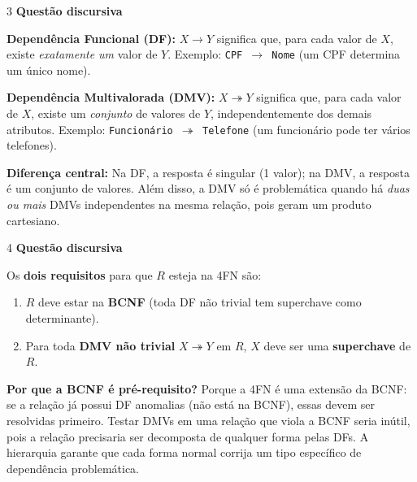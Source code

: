 \documentclass[12pt]{article}
\begin{document}
\vspace{0.5cm}

\begin{gabbox}{3}
\textbf{Questão discursiva}
\end{gabbox}

\begin{respdisc}
\textbf{Dependência Funcional (DF):} $X \to Y$ significa que, para cada valor de $X$, existe \emph{exatamente um} valor de $Y$. Exemplo: \texttt{CPF $\to$ Nome} (um CPF determina um único nome).

\medskip
\textbf{Dependência Multivalorada (DMV):} $X \twoheadrightarrow Y$ significa que, para cada valor de $X$, existe um \emph{conjunto} de valores de $Y$, independentemente dos demais atributos. Exemplo: \texttt{Funcionário $\twoheadrightarrow$ Telefone} (um funcionário pode ter vários telefones).

\medskip
\textbf{Diferença central:} Na DF, a resposta é singular (1 valor); na DMV, a resposta é um conjunto de valores. Além disso, a DMV só é problemática quando há \emph{duas ou mais} DMVs independentes na mesma relação, pois geram um produto cartesiano.
\end{respdisc}

\vspace{0.5cm}

\begin{gabbox}{4}
\textbf{Questão discursiva}
\end{gabbox}

\begin{respdisc}
Os \textbf{dois requisitos} para que $R$ esteja na 4FN são:
\begin{enumerate}
  \item $R$ deve estar na \textbf{BCNF} (toda DF não trivial tem superchave como determinante).
  \item Para toda \textbf{DMV não trivial} $X \twoheadrightarrow Y$ em $R$, $X$ deve ser uma \textbf{superchave} de $R$.
\end{enumerate}

\medskip
\textbf{Por que a BCNF é pré-requisito?} Porque a 4FN é uma extensão da BCNF: se a relação já possui DF anomalias (não está na BCNF), essas devem ser resolvidas primeiro. Testar DMVs em uma relação que viola a BCNF seria inútil, pois a relação precisaria ser decomposta de qualquer forma pelas DFs. A hierarquia garante que cada forma normal corrija um tipo específico de dependência problemática.
\end{respdisc}
\end{document}
